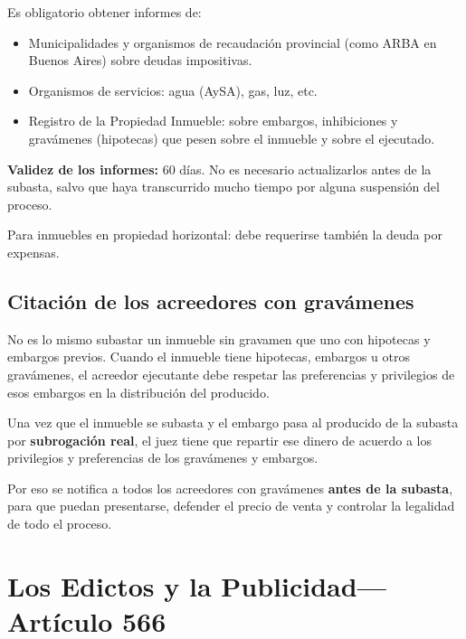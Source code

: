 \documentclass[12pt,oneside]{book}
\begin{document}
\begin{important}
Es obligatorio obtener informes de:

\begin{itemize}
    \item Municipalidades y organismos de recaudación provincial (como ARBA en Buenos Aires) sobre deudas impositivas.
    \item Organismos de servicios: agua (AySA), gas, luz, etc.
    \item Registro de la Propiedad Inmueble: sobre embargos, inhibiciones y gravámenes (hipotecas) que pesen sobre el inmueble y sobre el ejecutado.
\end{itemize}

\textbf{Validez de los informes:} 60 días. No es necesario actualizarlos antes de la subasta, salvo que haya transcurrido mucho tiempo por alguna suspensión del proceso.

Para inmuebles en propiedad horizontal: debe requerirse también la deuda por expensas.
\end{important}

\subsection{Citación de los acreedores con gravámenes}

No es lo mismo subastar un inmueble sin gravamen que uno con hipotecas y embargos previos. Cuando el inmueble tiene hipotecas, embargos u otros gravámenes, el acreedor ejecutante debe respetar las preferencias y privilegios de esos embargos en la distribución del producido.

Una vez que el inmueble se subasta y el embargo pasa al producido de la subasta por \textbf{subrogación real}, el juez tiene que repartir ese dinero de acuerdo a los privilegios y preferencias de los gravámenes y embargos.

Por eso se notifica a todos los acreedores con gravámenes \textbf{antes de la subasta}, para que puedan presentarse, defender el precio de venta y controlar la legalidad de todo el proceso.

\section{Los Edictos y la Publicidad---Artículo 566}
\end{document}
